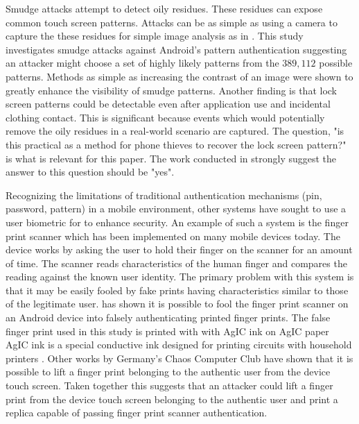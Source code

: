 Smudge attacks attempt to detect oily residues.
These residues can expose common touch screen patterns.
%
Attacks can be as simple as using a camera to capture the
these residues for simple image analysis as in
\cite{aviv2010smudge}.
%
This study investigates smudge attacks against
Android's pattern authentication suggesting
an attacker might choose a set of highly likely patterns
from the $389,112$ possible patterns.
%
Methods as simple as increasing the contrast of
an image were shown to greatly enhance the visibility of smudge patterns.
%
Another finding is that lock screen patterns could be detectable
even after application use and
incidental clothing contact.
This is significant because 
events which would potentially remove
the oily residues in a real-world scenario
are captured.
%
The question, "is this practical as a method for
phone thieves to recover the lock screen pattern?"
is what is relevant for this paper.
The work conducted in \cite{aviv2010smudge}
strongly suggest the answer to
this question should be "yes".

Recognizing the limitations of 
traditional authentication mechanisms (pin, password, pattern)
in a mobile environment,
other systems have sought to use a user biometric 
for to enhance security.
%
An example of such a system is the finger print scanner 
which has been implemented on many mobile devices today.
The device works by 
asking the user to hold their finger on the scanner for an amount of time.
The scanner reads characteristics of the human finger and
compares the reading against the known user identity.
%
The primary problem with this system is that it may be easily fooled
by fake prints having characteristics similar to those of the
legitimate user.
%
\cite{cao2016hacking} has shown it is possible to fool the
finger print scanner on an Android device into 
falsely authenticating printed finger prints.
The false finger print used in this study
is printed with with AgIC ink on AgIC paper
AgIC ink is 
a special conductive ink designed for printing circuits
with household printers \cite{AGIC}.
%
Other works by Germany's Chaos Computer Club \cite{CHAOS}
have shown that it is possible to lift a finger print
belonging to the authentic user from the device touch screen.
%
Taken together this suggests that an attacker
could lift a finger print from the device touch screen
belonging to the authentic user and 
print a replica capable of passing 
finger print scanner authentication.


